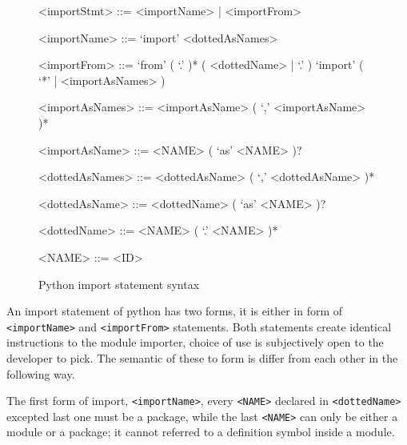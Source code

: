 
\begin{figure}[ht]
    \begin{framed}
        \begin{grammar}
            <importStmt>
            ::= <importName>
            | <importFrom>

            <importName>
            ::= `import' <dottedAsNames>

            <importFrom>
            ::= `from' ( `.' )* ( <dottedName> | `.' ) `import' ( `*' | <importAsNames> )

            <importAsNames>
            ::= <importAsName> ( `,' <importAsName> )*

            <importAsName>
            ::= <NAME> ( `as' <NAME> )?

            <dottedAsNames>
            ::= <dottedAsName> ( `,' <dottedAsName> )*

            <dottedAsName>
            ::= <dottedName> ( `as' <NAME> )?

            <dottedName>
            ::= <NAME> ( `.' <NAME> )*

            <NAME> ::= <ID>
        \end{grammar}
    \end{framed}
    \caption{Python import statement syntax }
    \label{fig:python-import-stmt-syntax}
\end{figure}

An import statement of python has two forms, it is either in form of \texttt{<importName>} and \texttt{<importFrom>} statements. Both statements create identical instructions to the module importer, choice of use is subjectively open to the developer to pick. The semantic of these to form is differ from each other in the following way.

The first form of import, \texttt{<importName>}, every \texttt{<NAME>} declared in \texttt{<dottedName>} excepted last one must be a package, while the last \texttt{<NAME>} can only be either a module or a package; it cannot referred to a definition symbol inside a module.

